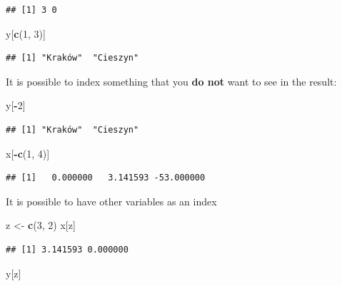 \documentclass[
]{book}
\newenvironment{Shaded}{\begin{snugshade}}{\end{snugshade}}
\newcommand{\DecValTok}[1]{\textcolor[rgb]{0.00,0.00,0.81}{#1}}
\newcommand{\KeywordTok}[1]{\textcolor[rgb]{0.13,0.29,0.53}{\textbf{#1}}}
\newcommand{\NormalTok}[1]{#1}
\newcommand{\OperatorTok}[1]{\textcolor[rgb]{0.81,0.36,0.00}{\textbf{#1}}}
\newcommand{\StringTok}[1]{\textcolor[rgb]{0.31,0.60,0.02}{#1}}
\begin{document}
\begin{verbatim}
## [1] 3 0
\end{verbatim}

\begin{Shaded}
\begin{Highlighting}[]
\NormalTok{y[}\KeywordTok{c}\NormalTok{(}\DecValTok{1}\NormalTok{, }\DecValTok{3}\NormalTok{)]}
\end{Highlighting}
\end{Shaded}

\begin{verbatim}
## [1] "Kraków"  "Cieszyn"
\end{verbatim}

It is possible to index something that you \textbf{do not} want to see in the result:

\begin{Shaded}
\begin{Highlighting}[]
\NormalTok{y[}\OperatorTok{-}\DecValTok{2}\NormalTok{]}
\end{Highlighting}
\end{Shaded}

\begin{verbatim}
## [1] "Kraków"  "Cieszyn"
\end{verbatim}

\begin{Shaded}
\begin{Highlighting}[]
\NormalTok{x[}\OperatorTok{-}\KeywordTok{c}\NormalTok{(}\DecValTok{1}\NormalTok{, }\DecValTok{4}\NormalTok{)]}
\end{Highlighting}
\end{Shaded}

\begin{verbatim}
## [1]   0.000000   3.141593 -53.000000
\end{verbatim}

It is possible to have other variables as an index

\begin{Shaded}
\begin{Highlighting}[]
\NormalTok{z <-}\StringTok{ }\KeywordTok{c}\NormalTok{(}\DecValTok{3}\NormalTok{, }\DecValTok{2}\NormalTok{)}
\NormalTok{x[z]}
\end{Highlighting}
\end{Shaded}

\begin{verbatim}
## [1] 3.141593 0.000000
\end{verbatim}

\begin{Shaded}
\begin{Highlighting}[]
\NormalTok{y[z]}
\end{Highlighting}
\end{Shaded}
\end{document}
